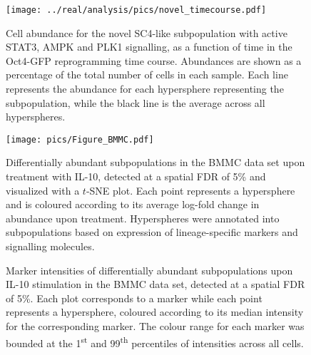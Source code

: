 \documentclass{article}
\begin{document}
\begin{figure}[p]
    \begin{center}
        \texttt{[image: ../real/analysis/pics/novel\_timecourse.pdf]}
    \end{center}
    \caption{
        Cell abundance for the novel SC4-like subpopulation with active STAT3, AMPK and PLK1 signalling, as a function of time in the Oct4-GFP reprogramming time course.
        Abundances are shown as a percentage of the total number of cells in each sample.
        Each line represents the abundance for each hypersphere representing the subpopulation, while the black line is the average across all hyperspheres.
    }
    \label{fig:nonlinear}
\end{figure}

\begin{figure}[p]
    \begin{center}
        \texttt{[image: pics/Figure\_BMMC.pdf]}
    \end{center}
    \caption{Differentially abundant subpopulations in the BMMC data set upon treatment with IL-10, detected at a spatial FDR of 5\% and visualized with a $t$-SNE plot.
            Each point represents a hypersphere and is coloured according to its average log-fold change in abundance upon treatment.
            Hyperspheres were annotated into subpopulations based on expression of lineage-specific markers and signalling molecules.
    }
    \label{fig:bmmc}
\end{figure}

\begin{figure}[p]
    \begin{center}
    \end{center}
    \caption{
        Marker intensities of differentially abundant subpopulations upon IL-10 stimulation in the BMMC data set, detected at a spatial FDR of 5\%.
        Each plot corresponds to a marker while each point represents a hypersphere, coloured according to its median intensity for the corresponding marker.
        The colour range for each marker was bounded at the 1\textsuperscript{st} and 99\textsuperscript{th} percentiles of intensities across all cells.
    }
    \label{fig:bmmc_markers}
\end{figure}
\end{document}
